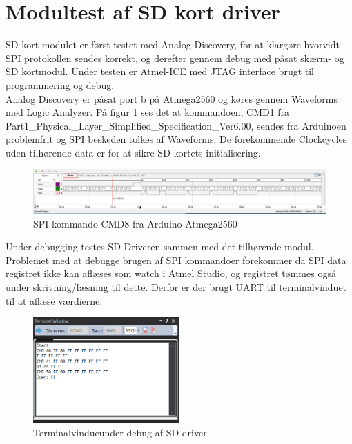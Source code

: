 \section{Modultest af SD kort driver}

SD kort modulet er først testet med Analog Discovery, for at klargøre hvorvidt SPI protokollen sendes korrekt, og derefter gennem debug med påsat skærm- og SD kortmodul.
Under testen er Atmel-ICE med JTAG interface brugt til programmering og debug.\\
Analog Discovery er påsat port b på Atmega2560 og køres gennem Waveforms med Logic Analyzer.
På figur \ref{fig:SPIanalog} ses det at kommandoen, CMD1 fra Part1\_Physical\_Layer\_Simplified\_Specification\_Ver6.00, sendes fra Arduinoen problemfrit og SPI beskeden tolkes af Waveforms. De forekommende Clockcycles uden tilhørende data er for at sikre SD kortets initialisering.
 
\begin{figure}[H]
	\center
	\includegraphics[width=1.0\textwidth]{Figur/SPIoutputSDTest.png}
	\caption{SPI kommando CMD8 fra Arduino Atmega2560}
	\label{fig:SPIanalog}
\end{figure}

Under debugging testes SD Driveren sammen med det tilhørende modul. Problemet med at debugge brugen af SPI kommandoer forekommer da SPI data registret ikke kan aflæses som watch i Atmel Studio, og registret tømmes også under skrivning/læsning til dette. Derfor er der brugt UART til terminalvinduet til at aflæse værdierne.

\begin{figure}[H]
	\center
	\includegraphics[width=0.5\textwidth]{Figur/SDuartOpen.png}
	\caption{Terminalvindueunder debug af SD driver}
	\label{fig:SDopen}
\end{figure}

